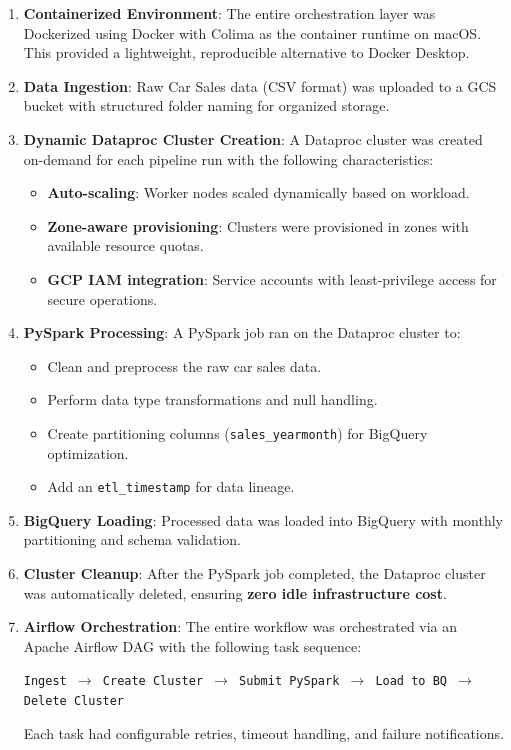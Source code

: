 \documentclass[12pt, a4paper]{article}
\begin{document}
\begin{enumerate}
    \item \textbf{Containerized Environment}: The entire orchestration layer was Dockerized using Docker with Colima as the container runtime on macOS. This provided a lightweight, reproducible alternative to Docker Desktop.
    
    \item \textbf{Data Ingestion}: Raw Car Sales data (CSV format) was uploaded to a GCS bucket with structured folder naming for organized storage.
    
    \item \textbf{Dynamic Dataproc Cluster Creation}: A Dataproc cluster was created on-demand for each pipeline run with the following characteristics:
    \begin{itemize}
        \item \textbf{Auto-scaling}: Worker nodes scaled dynamically based on workload.
        \item \textbf{Zone-aware provisioning}: Clusters were provisioned in zones with available resource quotas.
        \item \textbf{GCP IAM integration}: Service accounts with least-privilege access for secure operations.
    \end{itemize}
    
    \item \textbf{PySpark Processing}: A PySpark job ran on the Dataproc cluster to:
    \begin{itemize}
        \item Clean and preprocess the raw car sales data.
        \item Perform data type transformations and null handling.
        \item Create partitioning columns (\texttt{sales\_yearmonth}) for BigQuery optimization.
        \item Add an \texttt{etl\_timestamp} for data lineage.
    \end{itemize}
    
    \item \textbf{BigQuery Loading}: Processed data was loaded into BigQuery with monthly partitioning and schema validation.
    
    \item \textbf{Cluster Cleanup}: After the PySpark job completed, the Dataproc cluster was automatically deleted, ensuring \textbf{zero idle infrastructure cost}.
    
    \item \textbf{Airflow Orchestration}: The entire workflow was orchestrated via an Apache Airflow DAG with the following task sequence:
    
    \begin{center}
        \texttt{Ingest $\rightarrow$ Create Cluster $\rightarrow$ Submit PySpark $\rightarrow$ Load to BQ $\rightarrow$ Delete Cluster}
    \end{center}
    
    \noindent Each task had configurable retries, timeout handling, and failure notifications.
\end{enumerate}
\end{document}
